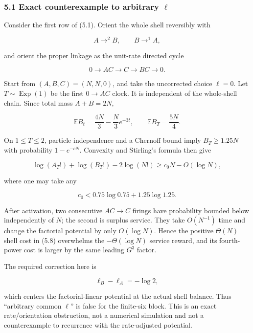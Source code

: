\subsubsection{\texorpdfstring{5.1 Exact counterexample to arbitrary
\(\ell\)}{5.1 Exact counterexample to arbitrary \textbackslash ell}}

Consider the first row of (5.1). Orient the whole shell reversibly with

\[
 A\mathop{\longrightarrow}^{2}B,
 \qquad B\mathop{\longrightarrow}^{1}A,              \tag{5.5}
\]

and orient the proper linkage as the unit-rate directed cycle

\[
 0\longrightarrow AC\longrightarrow C
  \longrightarrow BC\longrightarrow0.               \tag{5.6}
\]

Start from \((A,B,C)=(N,N,0)\), and take the uncorrected choice
\(\ell=0\). Let \(T\sim\operatorname{Exp}(1)\) be the first \(0\to AC\)
clock. It is independent of the whole-shell chain. Since total mass
\(A+B=2N\),

\[
 \mathbb E B_t=\frac{4N}{3}-\frac{N}{3}e^{-3t},
 \qquad
 \mathbb E B_T=\frac{5N}{4}.                         \tag{5.7}
\]

On \(1\le T\le2\), particle independence and a Chernoff bound imply
\(B_T\ge1.25N\) with probability \(1-e^{-cN}\). Convexity and Stirling's
formula then give

\[
 \log(A_T!)+\log(B_T!)-2\log(N!)
 \ge c_0N-O(\log N),                                 \tag{5.8}
\]

where one may take any

\[
 c_0<0.75\log0.75+1.25\log1.25.
\]

After activation, two consecutive \(AC\to C\) firings have probability
bounded below independently of \(N\); the second is surplus service.
They take \(O(N^{-1})\) time and change the factorial potential by only
\(O(\log N)\). Hence the positive \(\Theta(N)\) shell cost in (5.8)
overwhelms the \(-\Theta(\log N)\) service reward, and its fourth-power
cost is larger by the same leading \(G^3\) factor.

The required correction here is

\[
 \ell_B-\ell_A=-\log2,                               \tag{5.9}
\]

which centers the factorial-linear potential at the actual shell
balance. Thus ``arbitrary common \(\ell\)'' is false for the finite-six
block. This is an exact rate/orientation obstruction, not a numerical
simulation and not a counterexample to recurrence with the rate-adjusted
potential.

